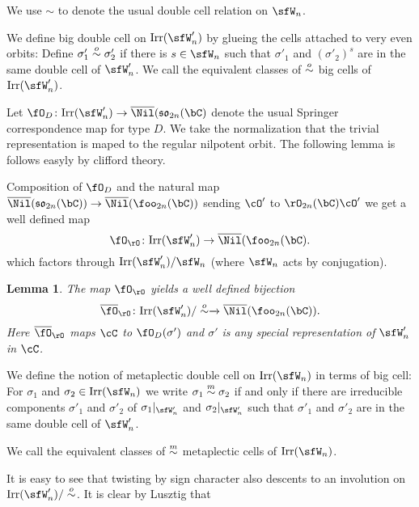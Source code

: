 \documentclass[12pt,a4paper]{amsart}
\def\fso{\mathfrak{so}}
\numberwithin{equation}{section}
\newtheorem{lem}[thm]{Lemma}
\theoremstyle{remark}
\begin{document}
We use $\sim$ to denote the usual double cell relation on $\sfW_{n}$.

We define big double cell on $\Irr(\sfW'_{n})$ by glueing the cells attached to
very even orbits:
Define $\sigma'_{1}\stackrel{o}{\sim} \sigma'_{2}$ if there is $s\in \sfW_{n}$ such that
$\sigma'_{1}$ and $(\sigma'_{2})^{s}$ are in the same double cell of $\sfW'_{n}$.
We call the equivalent classes of $\stackrel{o}{\sim}$ big cells of $\Irr(\sfW'_{n})$.


Let $\SpringerD\colon \Irr(\sfW'_{n}) \rightarrow  \bNil(\fso_{2n}(\bC)$ denote
the usual Springer correspondence map for type $D$. We take the normalization
that the trivial representation is maped to the regular nilpotent orbit.
The following lemma is follows easyly by clifford theory.

Composition of $\SpringerD$ and the natural map
$\bNil(\fso_{2n}(\bC))\rightarrow \bNil(\foo_{2n}(\bC))$ sending $\cO'$ to
$\rO_{2n}(\bC)\cO'$ we get a well defined map
\[
\SpringerO\colon  \Irr(\sfW'_{n}) \rightarrow  \bNil(\foo_{2n}(\bC).
\]
which factors through $\Irr(\sfW'_{n})/\sfW_{n}$ (where $\sfW_{n}$ acts by
conjugation).


\begin{lem}
 The map $\SpringerO$ yields a well defined bijection
  \[
   \bSpringerO\colon  \Irr(\sfW'_{n})/\osim \xrightarrow{ } \bNil(\foo_{2n}(\bC)).
  \]
  Here $\bSpringerO$ maps $\cC$ to $ \SpringerD(\sigma')$ and
  $\sigma'$ is any special representation of $\sfW'_{n}$ in $\cC$.
\end{lem}


We define the notion of metaplectic double cell on $\Irr(\sfW_{n})$ in terms of
big cell:
For $\sigma_{1}$ and $\sigma_{2}\in \Irr(\sfW_{n})$ we write $\sigma_{1}\stackrel{m}{\sim} \sigma_{2}$
if and only if there are irreducible components
$\sigma'_{1}$ and $\sigma'_{2}$ of
$\sigma_{1}|_{\sfW'_{n}}$ and $\sigma_{2}|_{\sfW'_{n}}$ such that $\sigma'_{1}$
and $\sigma'_{2}$ are in the same double cell of $\sfW'_{n}$.


We call the equivalent classes of $\stackrel{m}{\sim}$ metaplectic cells of $\Irr(\sfW_{n})$.

It is easy to see that twisting by sign character also descents to an
involution on $\Irr(\sfW'_{n})/\osim$.
It is clear by Lusztig that
\end{document}
